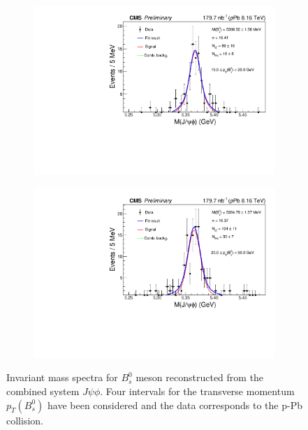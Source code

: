 \begin{figure}[htp!]
\begin{subfigure}[b]{0.475\textwidth}
		\includegraphics[width=\textwidth]{MainContent/Figs/mass/mass_BsFit_ptbins_15_20.PDF}
		\caption{}
	\end{subfigure}
	\hfill
	\begin{subfigure}[b]{0.475\textwidth}
		\centering
		\includegraphics[width=\textwidth]{MainContent/Figs/mass/mass_BsFit_ptbins_20_50.PDF}
		\caption{}%
	\end{subfigure}
	\caption{Invariant mass spectra for $B^0_s$ meson reconstructed from the combined system $J\psi\phi$. Four intervals for the transverse momentum $p_T(B^0_s)$ have been considered and the data corresponds to the p-Pb collision.}
	\label{fig:mass_ptbins}
	
\end{figure}



